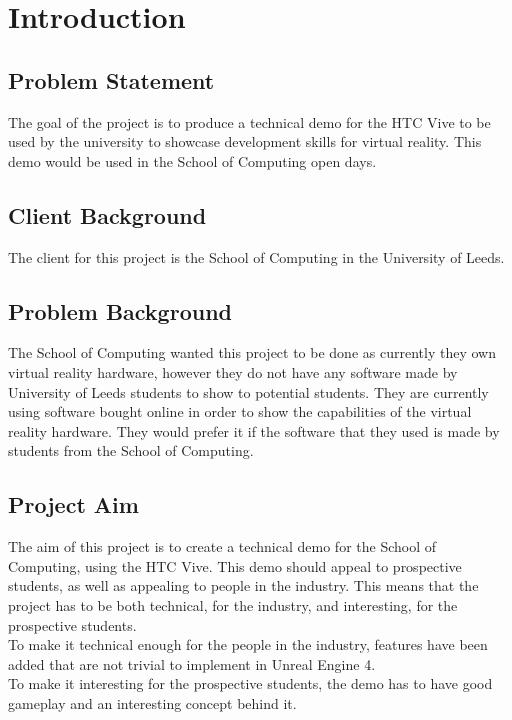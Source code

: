 \chapter{Introduction}
\label{chapter1}

\section{Problem Statement}
The goal of the project is to produce a technical demo for the HTC Vive to be used by the university to showcase development skills for virtual reality. This demo would be used in the School of Computing open days.

\section{Client Background}
The client for this project is the School of Computing in the University of Leeds.

\section{Problem Background}
The School of Computing wanted this project to be done as currently they own virtual reality hardware, however they do not have any software made by University of Leeds students to show to potential students. They are currently using software bought online in order to show the capabilities of the virtual reality hardware. They would prefer it if the software that they used is made by students from the School of Computing.


\section{Project Aim}
The aim of this project is to create a technical demo for the School of Computing, using the HTC Vive. This demo should appeal to prospective students, as well as appealing to people in the industry. This means that the project has to be both technical, for the industry, and interesting, for the prospective students.\\
To make it technical enough for the people in the industry, features have been added that are not trivial to implement in Unreal Engine 4.\\
To make it interesting for the prospective students, the demo has to have good gameplay and an interesting concept behind it.\\


